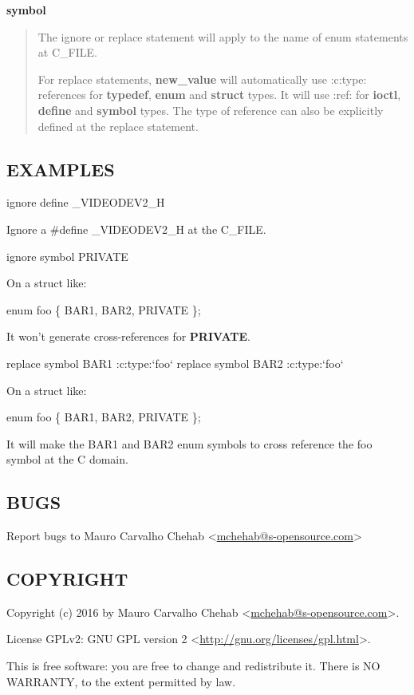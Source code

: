 \documentclass[a4paper,8pt,english]{sphinxmanual}
\begin{document}
\textbf{symbol}
\begin{quote}

The ignore or replace statement will apply to the name of enum statements
at C\_FILE.

For replace statements, \textbf{new\_value} will automatically use :c:type:
references for \textbf{typedef}, \textbf{enum} and \textbf{struct} types. It will use :ref:
for \textbf{ioctl}, \textbf{define} and \textbf{symbol} types. The type of reference can
also be explicitly defined at the replace statement.
\end{quote}


\subsection{EXAMPLES}
\label{doc-guide/parse-headers:examples}
ignore define \_VIDEODEV2\_H

Ignore a \#define \_VIDEODEV2\_H at the C\_FILE.

ignore symbol PRIVATE

On a struct like:

enum foo \{ BAR1, BAR2, PRIVATE \};

It won't generate cross-references for \textbf{PRIVATE}.

replace symbol BAR1 :c:type:{}`foo{}`
replace symbol BAR2 :c:type:{}`foo{}`

On a struct like:

enum foo \{ BAR1, BAR2, PRIVATE \};

It will make the BAR1 and BAR2 enum symbols to cross reference the foo
symbol at the C domain.


\subsection{BUGS}
\label{doc-guide/parse-headers:bugs}
Report bugs to Mauro Carvalho Chehab \textless{}\href{mailto:mchehab@s-opensource.com}{mchehab@s-opensource.com}\textgreater{}


\subsection{COPYRIGHT}
\label{doc-guide/parse-headers:copyright}
Copyright (c) 2016 by Mauro Carvalho Chehab \textless{}\href{mailto:mchehab@s-opensource.com}{mchehab@s-opensource.com}\textgreater{}.

License GPLv2: GNU GPL version 2 \textless{}\href{http://gnu.org/licenses/gpl.html}{http://gnu.org/licenses/gpl.html}\textgreater{}.

This is free software: you are free to change and redistribute it.
There is NO WARRANTY, to the extent permitted by law.



\renewcommand{\indexname}{Index}
\printindex
\end{document}
